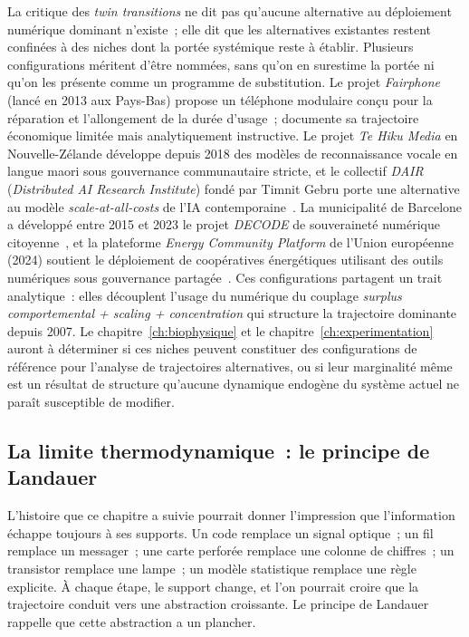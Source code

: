 %
La critique des \emph{twin transitions} ne dit pas qu'aucune alternative au déploiement numérique dominant n'existe~; elle dit que les alternatives existantes restent confinées à des niches dont la portée systémique reste à établir. Plusieurs configurations méritent d'être nommées, sans qu'on en surestime la portée ni qu'on les présente comme un programme de substitution. Le projet \emph{Fairphone} (lancé en 2013 aux Pays-Bas) propose un téléphone modulaire conçu pour la réparation et l'allongement de la durée d'usage~; \textcite{haucke_smartphone_2018} documente sa trajectoire économique limitée mais analytiquement instructive. Le projet \emph{Te Hiku Media} en Nouvelle-Zélande développe depuis 2018 des modèles de reconnaissance vocale en langue maori sous gouvernance communautaire stricte, et le collectif \emph{DAIR} (\emph{Distributed AI Research Institute}) fondé par Timnit Gebru porte une alternative au modèle \emph{scale-at-all-costs} de l'IA contemporaine~\parencite{hao_empire_2025}. La municipalité de Barcelone a développé entre 2015 et 2023 le projet \emph{DECODE} de souveraineté numérique citoyenne~\parencite{smith_smart_2021}, et la plateforme \emph{Energy Community Platform} de l'Union européenne (2024) soutient le déploiement de coopératives énergétiques utilisant des outils numériques sous gouvernance partagée~\parencite{energy_community_2024}. Ces configurations partagent un trait analytique~: elles découplent l'usage du numérique du couplage \emph{surplus comportemental + scaling + concentration} qui structure la trajectoire dominante depuis 2007. Le chapitre~\ref{ch:biophysique} et le chapitre~\ref{ch:experimentation} auront à déterminer si ces niches peuvent constituer des configurations de référence pour l'analyse de trajectoires alternatives, ou si leur marginalité même est un résultat de structure qu'aucune dynamique endogène du système actuel ne paraît susceptible de modifier.


\subsection{La limite thermodynamique~: le principe de Landauer}\label{subsec:landauer}

%
L'histoire que ce chapitre a suivie pourrait donner l'impression que l'information échappe toujours à ses supports. Un code remplace un signal optique~; un fil remplace un messager~; une carte perforée remplace une colonne de chiffres~; un transistor remplace une lampe~; un modèle statistique remplace une règle explicite. À chaque étape, le support change, et l'on pourrait croire que la trajectoire conduit vers une abstraction croissante. Le principe de Landauer rappelle que cette abstraction a un plancher.

